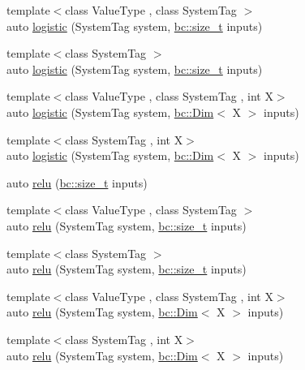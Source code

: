 \begin{DoxyCompactItemize}
{\footnotesize template$<$class Value\+Type , class System\+Tag $>$ }\\auto \hyperlink{namespacebc_1_1nn_a56e8a819ad99c89d7e2dbb5359f72fba}{logistic} (System\+Tag system, \hyperlink{namespacebc_aaf8e3fbf99b04b1b57c4f80c6f55d3c5}{bc\+::size\+\_\+t} inputs)
\item 
{\footnotesize template$<$class System\+Tag $>$ }\\auto \hyperlink{namespacebc_1_1nn_ab2671a4c0d9e2e4f2b6abeb7290e9c61}{logistic} (System\+Tag system, \hyperlink{namespacebc_aaf8e3fbf99b04b1b57c4f80c6f55d3c5}{bc\+::size\+\_\+t} inputs)
\item 
{\footnotesize template$<$class Value\+Type , class System\+Tag , int X$>$ }\\auto \hyperlink{namespacebc_1_1nn_a2f995cbb0542f096ceac9e6d5df6408f}{logistic} (System\+Tag system, \hyperlink{structbc_1_1Dim}{bc\+::\+Dim}$<$ X $>$ inputs)
\item 
{\footnotesize template$<$class System\+Tag , int X$>$ }\\auto \hyperlink{namespacebc_1_1nn_a6ae0cff41285566585676c1ea3c392ec}{logistic} (System\+Tag system, \hyperlink{structbc_1_1Dim}{bc\+::\+Dim}$<$ X $>$ inputs)
\item 
auto \hyperlink{namespacebc_1_1nn_a44b0c2822ad51e7b6832ae7305728332}{relu} (\hyperlink{namespacebc_aaf8e3fbf99b04b1b57c4f80c6f55d3c5}{bc\+::size\+\_\+t} inputs)
\item 
{\footnotesize template$<$class Value\+Type , class System\+Tag $>$ }\\auto \hyperlink{namespacebc_1_1nn_aead5ec7f5331b0334e7b41c922360236}{relu} (System\+Tag system, \hyperlink{namespacebc_aaf8e3fbf99b04b1b57c4f80c6f55d3c5}{bc\+::size\+\_\+t} inputs)
\item 
{\footnotesize template$<$class System\+Tag $>$ }\\auto \hyperlink{namespacebc_1_1nn_a863a41473186e29b827b21b6009144e7}{relu} (System\+Tag system, \hyperlink{namespacebc_aaf8e3fbf99b04b1b57c4f80c6f55d3c5}{bc\+::size\+\_\+t} inputs)
\item 
{\footnotesize template$<$class Value\+Type , class System\+Tag , int X$>$ }\\auto \hyperlink{namespacebc_1_1nn_a38872deedfd974a835678e32fc2cb5ce}{relu} (System\+Tag system, \hyperlink{structbc_1_1Dim}{bc\+::\+Dim}$<$ X $>$ inputs)
\item 
{\footnotesize template$<$class System\+Tag , int X$>$ }\\auto \hyperlink{namespacebc_1_1nn_a6858f92eebf902014b9981cc8859d3c1}{relu} (System\+Tag system, \hyperlink{structbc_1_1Dim}{bc\+::\+Dim}$<$ X $>$ inputs)

\end{DoxyCompactItemize}
